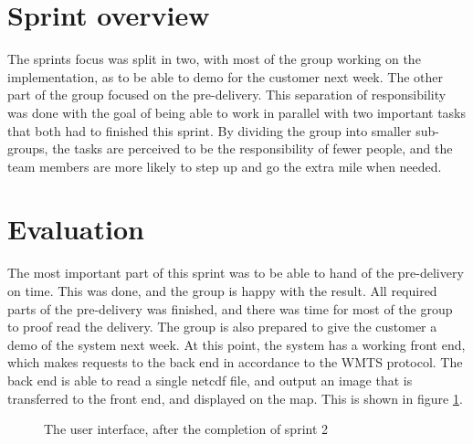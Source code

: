 \documentclass[11pt,a4paper,titlepage,oneside]{report}
\begin{document}
\section{Sprint overview}
The sprints focus was split in two, with most of the group working on the implementation, as to be able to demo for the customer next week. The other part of the group focused on the pre-delivery. This separation of responsibility was done with the goal of being able to work in parallel with two important tasks that both had to finished this sprint. By dividing the group into smaller sub-groups, the tasks are perceived to be the responsibility of fewer people, and the team members are more likely to step up and go the extra mile when needed. 

\section{Evaluation}
The most important part of this sprint was to be able to hand of the pre-delivery on time. This was done, and the group is happy with the result. All required parts of the pre-delivery was finished, and there was time for most of the group to proof read the delivery. The group is also prepared to give the customer a demo of the system next week. At this point, the system has a working front end, which makes requests to the back end in accordance to the WMTS protocol. The back end is able to read a single \gls{netcdf} file, and output an image that is transferred to the front end, and displayed on the map. This is shown in figure \ref{fig:UIAfterSprint2}.

\begin{figure}[h]
\begin{center}
\caption{The user interface, after the completion of sprint 2}
\label{fig:UIAfterSprint2}
\end{center}
\end{figure}
\end{document}
